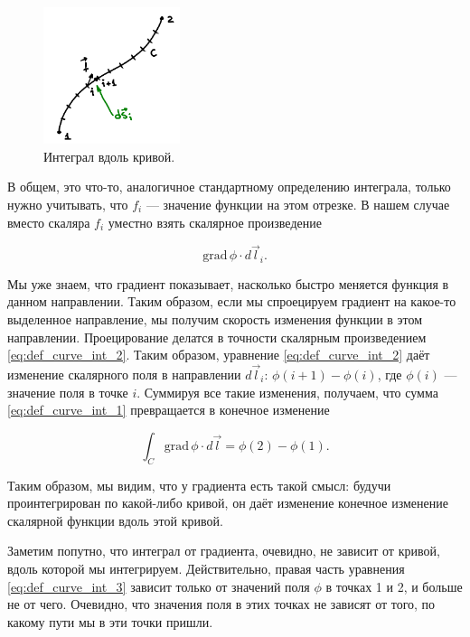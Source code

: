 \documentclass[12pt,a4paper]{article}
\numberwithin{equation}{section}
\numberwithin{equation}{section}
\newcommand{\grad}{\mathrm{grad}\,}
\begin{document}
\begin{figure}
  \vspace{-0.5cm}
  \begin{center}
    \includegraphics[width=4cm,height=4cm]{curve_int.pdf}
  \end{center}
  \caption{Интеграл вдоль кривой.}
  \label{fig:curve_int}
\end{figure}


В общем, это что-то, аналогичное стандартному определению интеграла,
только нужно учитывать, что $f_i$ --- значение функции на этом
отрезке. В нашем случае вместо скаляра $f_i$ уместно взять скалярное
произведение 

\begin{equation}
  \label{eq:def_curve_int_2}
  \grad \phi \cdot d\vec{l}_i.
\end{equation}

Мы уже знаем, что градиент показывает, насколько быстро меняется
функция в данном направлении. Таким образом, если мы спроецируем
градиент на какое-то выделенное направление, мы получим скорость
изменения функции в этом направлении. Проецирование делатся в точности
скалярным произведением \eqref{eq:def_curve_int_2}. Таким образом,
уравнение \eqref{eq:def_curve_int_2} даёт изменение скалярного поля в
направлении $d\vec{l}_i$: $\phi(i+1) - \phi(i)$, где $\phi(i)$ ---
значение поля в точке $i$. Суммируя все такие изменения, получаем, что
сумма \eqref{eq:def_curve_int_1} превращается в конечное изменение 

\begin{equation}
  \label{eq:def_curve_int_3}
  \int_C \grad \phi \cdot d\vec{l} = \phi(2) - \phi(1).
\end{equation}

Таким образом, мы видим, что у градиента есть такой смысл: будучи
проинтегрирован по какой-либо кривой, он даёт изменение конечное
изменение скалярной функции вдоль этой кривой. 

Заметим попутно, что интеграл от градиента, очевидно, не зависит от
кривой, вдоль которой мы интегрируем. Действительно, правая часть
уравнения \eqref{eq:def_curve_int_3} зависит только от значений поля
$\phi$ в точках 1 и 2, и больше не от чего. Очевидно, что значения
поля в этих точках не зависят от того, по какому пути мы в эти точки
пришли. 
\end{document}

